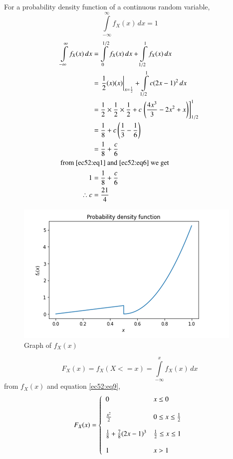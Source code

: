 For a probability density function of a continuous random variable, 
\begin{equation}
    \int \limits_{-\infty}^{\infty} f_X(x) \, dx = 1 \label{ec52:eq1}
\end{equation}
\begin{align}
    \int \limits_{-\infty}^{\infty} f_X(x) \, dx &=  \int \limits_0^{1/2} f_X(x) \, dx + \int \limits_{1/2}^1 f_X(x) \, dx\\
    &= \left. \frac{1}{2} (x)(x) \right\rvert_{x = \frac{1}{2}} + \int \limits_{1/2}^1 c(2x-1)^2 \, dx\\
    &= \frac{1}{2}\times\frac{1}{2}\times\frac{1}{2} + c\rsbrak{\brak{\frac{4x^3}{3} - 2x^2 + x}}_{1/2}^1 \\
    &= \frac{1}{8} + c\brak{\frac{1}{3} - \frac{1}{6}} \\
    &= \frac{1}{8} + \frac{c}{6}  \label{ec52:eq6}\\
    \intertext{from \eqref{ec52:eq1}  and \eqref{ec52:eq6} we get }
    1 &= \frac{1}{8} + \frac{c}{6} \\
    \therefore c &= \frac{21}{4}
\end{align}
\begin{figure}[!ht]
\centering
\includegraphics[width=\columnwidth]{solutions/ec/52/figures/pdfimage.png}
\caption{Graph of $f_X(x)$}
\end{figure}
\begin{equation} \label{ec52:eq9}
    F_X(x) = f_X(X<=x) = \int\limits_{-\infty}^x f_X(x) \, dx
\end{equation}
from $f_X(x)$ and equation \eqref{ec52:eq9}, 
\begin{displaymath}
    F_X(x)=\left\{
                    \begin{array}{ll}
                        0 & x\leq 0 \\\\
		                \frac{x^2}{2} &   0 \leq x \leq \frac{1}{2}  \\\\
		                \frac{1}{8} + \frac{7}{8} (2x-1)^3 & \frac{1}{2} \leq x \leq 1 \\\\
		                1 & x>1\\
	                \end{array}    
                \right.
\end{displaymath}
